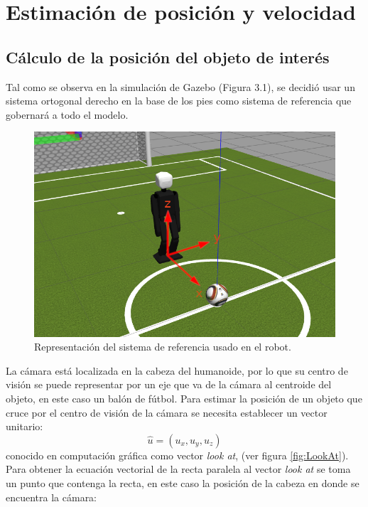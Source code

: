 \chapter{Estimación de posición y velocidad}
	\section{Cálculo de la posición del objeto de interés}
Tal como se observa en la simulación de Gazebo (Figura 3.1), se decidió usar un sistema ortogonal derecho en la base de los pies como sistema de referencia que gobernará a todo el modelo.

\begin{figure}
	\centering		
	\includegraphics[scale=2]{images/robot_ejes.png}
	\caption{Representación del sistema de referencia usado en el robot.}		
\end{figure}

La cámara está localizada en la cabeza del humanoide, por lo que su centro
de visión se puede representar por un eje que va de la cámara al centroide del 
objeto, en este caso un balón de fútbol.
Para estimar la posición de un objeto que cruce por el centro de visión de la
cámara se necesita establecer un vector unitario:
\[\hat{u} = (u_x, u_y, u_z)\]
conocido en computación gráfica como vector \textit{look at}, (ver figura \ref{fig:LookAt}). Para obtener la ecuación vectorial de la recta paralela al vector \textit{look at} se toma un punto que contenga la recta, en este caso la posición de la cabeza en donde se encuentra la cámara: 

